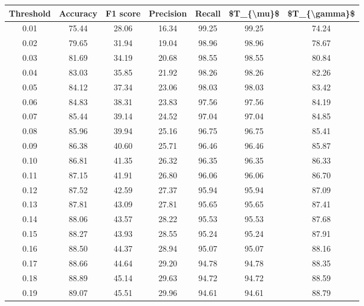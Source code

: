 \begin{tabular}{|c|c|c|c|c|c|c|}
\toprule
 Threshold &  Accuracy &  F1 score &  Precision &  Recall &  \$T\_\{\textbackslash mu\}\$ &  \$T\_\{\textbackslash gamma\}\$ \\
\hline
      0.01 &     75.44 &     28.06 &      16.34 &   99.25 &      99.25 &         74.24 \\
      0.02 &     79.65 &     31.94 &      19.04 &   98.96 &      98.96 &         78.67 \\
      0.03 &     81.69 &     34.19 &      20.68 &   98.55 &      98.55 &         80.84 \\
      0.04 &     83.03 &     35.85 &      21.92 &   98.26 &      98.26 &         82.26 \\
      0.05 &     84.12 &     37.34 &      23.06 &   98.03 &      98.03 &         83.42 \\
      0.06 &     84.83 &     38.31 &      23.83 &   97.56 &      97.56 &         84.19 \\
      0.07 &     85.44 &     39.14 &      24.52 &   97.04 &      97.04 &         84.85 \\
      0.08 &     85.96 &     39.94 &      25.16 &   96.75 &      96.75 &         85.41 \\
      0.09 &     86.38 &     40.60 &      25.71 &   96.46 &      96.46 &         85.87 \\
      0.10 &     86.81 &     41.35 &      26.32 &   96.35 &      96.35 &         86.33 \\
      0.11 &     87.15 &     41.91 &      26.80 &   96.06 &      96.06 &         86.70 \\
      0.12 &     87.52 &     42.59 &      27.37 &   95.94 &      95.94 &         87.09 \\
      0.13 &     87.81 &     43.09 &      27.81 &   95.65 &      95.65 &         87.41 \\
      0.14 &     88.06 &     43.57 &      28.22 &   95.53 &      95.53 &         87.68 \\
      0.15 &     88.27 &     43.93 &      28.55 &   95.24 &      95.24 &         87.91 \\
      0.16 &     88.50 &     44.37 &      28.94 &   95.07 &      95.07 &         88.16 \\
      0.17 &     88.66 &     44.64 &      29.20 &   94.78 &      94.78 &         88.35 \\
      0.18 &     88.89 &     45.14 &      29.63 &   94.72 &      94.72 &         88.59 \\
      0.19 &     89.07 &     45.51 &      29.96 &   94.61 &      94.61 &         88.79 \\

\end{tabular}

